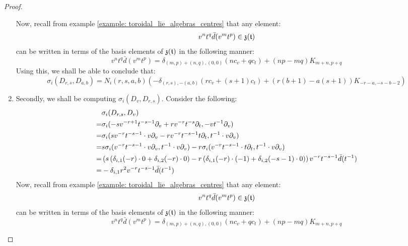 \begin{proof}
\begin{enumerate}
                    Now, recall from example \ref{example: toroidal_lie_algebras_centres} that any element:
                        $$v^n t^q \bar{d}(v^m t^p) \in \mathfrak{z}(\mathfrak{t})$$
                    can be written in terms of the basis elements of $\mathfrak{z}(\mathfrak{t})$ in the following manner:
                        $$v^n t^q \bar{d}(v^m t^p) = \delta_{(m, p) + (n, q), (0, 0)} ( n c_v + q c_t ) + (np - mq) K_{m + n, p + q}$$
                    Using this, we shall be able to conclude that:
                        $$\sigma_i(D_{r, s}, D_{a, b}) = N_i(r, s, a, b) \left( -\delta_{(r, s), -(a, b)} (r c_v + (s + 1) c_t) + ( r(b + 1) - a(s + 1) )K_{-r - a, -s - b - 2} \right)$$
                    \item Secondly, we shall be computing $\sigma_i(D_v, D_{r, s})$. Consider the following:
                        $$
                            \begin{aligned}
                                & \sigma_i(D_{r, s}, D_v)
                                \\
                                = & \sigma_i( -s v^{-r + 1} t^{-s - 1} \partial_v + r v^{-r} t^{-s} \partial_t, -v t^{-1} \partial_v )
                                \\
                                = & \sigma_i( s v^{-r} t^{-s - 1} \cdot v \partial_v - r v^{-r} t^{-s - 1} t \partial_t, t^{-1} \cdot v \partial_v )
                                \\
                                = & s \sigma_i( v^{-r} t^{-s - 1} \cdot v \partial_v, t^{-1} \cdot v \partial_v ) - r\sigma_i( v^{-r} t^{-s - 1} \cdot t \partial_t, t^{-1} \cdot v \partial_v )
                                \\
                                = & \left( s \left( \delta_{i, 1} (-r) \cdot 0 + \delta_{i, 2} (-r) \cdot 0 \right) - r\left( \delta_{i, 1} (-r) \cdot (-1) + \delta_{i, 2} (-s - 1) \cdot 0 \right) \right) v^{-r} t^{-s - 1} \bar{d}(t^{-1}) 
                                \\
                                = & -\delta_{i, 1} r^2 v^{-r} t^{-s - 1} \bar{d}(t^{-1})
                            \end{aligned}
                        $$
                    Now, recall from example \ref{example: toroidal_lie_algebras_centres} that any element:
                        $$v^n t^q \bar{d}(v^m t^p) \in \mathfrak{z}(\mathfrak{t})$$
                    can be written in terms of the basis elements of $\mathfrak{z}(\mathfrak{t})$ in the following manner:
                        $$v^n t^q \bar{d}(v^m t^p) = \delta_{(m, p) + (n, q), (0, 0)} ( n c_v + q c_t ) + (np - mq) K_{m + n, p + q}$$

\end{enumerate}
\end{proof}
